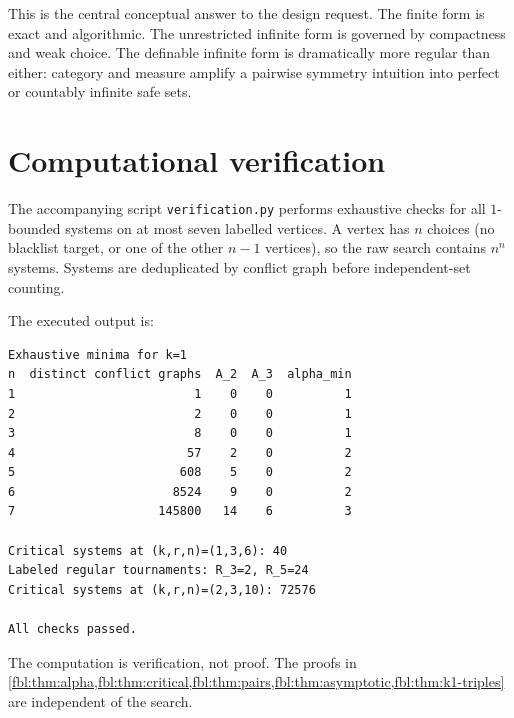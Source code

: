 \documentclass[11pt]{article}
\theoremstyle{definition}
\theoremstyle{remark}
\begin{document}
This is the central conceptual answer to the design request.  The finite
form is exact and algorithmic.  The unrestricted infinite form is governed
by compactness and weak choice.  The definable infinite form is dramatically
more regular than either: category and measure amplify a pairwise symmetry
intuition into perfect or countably infinite safe sets.

\section{Computational verification}\label{fbl:sec:computation}

The accompanying script \texttt{verification.py} performs exhaustive checks
for all $1$-bounded systems on at most seven labelled vertices.  A vertex has
$n$ choices (no blacklist target, or one of the other $n-1$ vertices), so the
raw search contains $n^n$ systems.  Systems are deduplicated by conflict
graph before independent-set counting.

The executed output is:
\begin{verbatim}
Exhaustive minima for k=1
n  distinct conflict graphs  A_2  A_3  alpha_min
1                         1    0    0          1
2                         2    0    0          1
3                         8    0    0          1
4                        57    2    0          2
5                       608    5    0          2
6                      8524    9    0          2
7                    145800   14    6          3

Critical systems at (k,r,n)=(1,3,6): 40
Labeled regular tournaments: R_3=2, R_5=24
Critical systems at (k,r,n)=(2,3,10): 72576

All checks passed.
\end{verbatim}

The computation is verification, not proof.  The proofs in
\cref{fbl:thm:alpha,fbl:thm:critical,fbl:thm:pairs,fbl:thm:asymptotic,fbl:thm:k1-triples} are
independent of the search.
\end{document}
